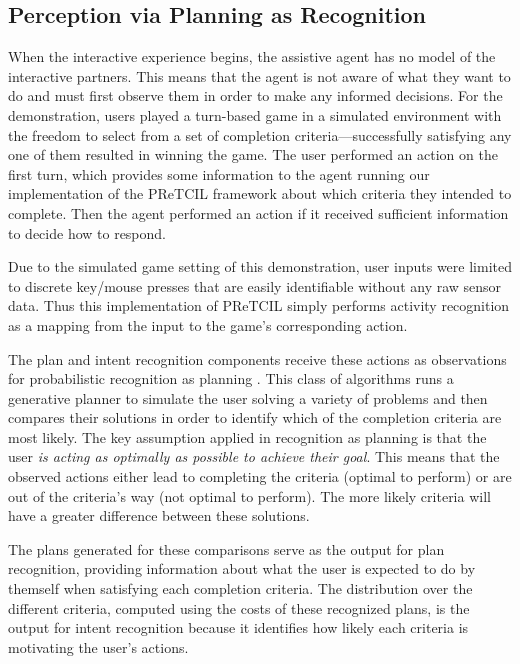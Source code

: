 \documentclass[letterpaper]{article} %
\begin{document}
\subsection{Perception via Planning as Recognition\label{sec:pretcil.perception}}
When the interactive experience begins, the assistive agent has no model of the interactive partners.  This means that the agent is not aware of what they want to do and must first observe them in order to make any informed decisions.  For the demonstration, users played a turn-based game in a simulated environment with the freedom to select from a set of completion criteria---successfully satisfying any one of them resulted in winning the game.  The user performed an action on the first turn, which provides some information to the agent running our implementation of the {\sc PReTCIL} framework about which criteria they intended to complete.  Then the agent performed an action if it received sufficient information to decide how to respond. %

Due to the simulated game setting of this demonstration, user inputs were limited to discrete key/mouse %
presses that are easily identifiable without any raw sensor data.  Thus this implementation of {\sc PReTCIL}
simply performs activity recognition as a mapping from the input to the game's corresponding action.

The plan and intent recognition components receive these actions as observations for probabilistic recognition as planning \cite{DBLP:conf/aaai/RamirezG10}.  This class of algorithms runs a generative planner to simulate the user solving a variety of problems and then compares their solutions in order to identify which of the completion criteria are most likely.  The key assumption applied in recognition as planning is that the user \textit{is acting as optimally as possible to achieve their goal}.  This means that %
the observed actions either lead to completing the criteria (optimal to perform) or are out of the criteria's way (not optimal to perform).  The more likely criteria will have a greater difference between these solutions. %

The plans generated for these comparisons serve as the output for plan recognition, providing information about what the user is expected to do by themself when satisfying each completion criteria.  The distribution over the different criteria, computed using the costs of these recognized plans, is the output for intent recognition because it identifies how likely each criteria is motivating the user's actions.
\end{document}
